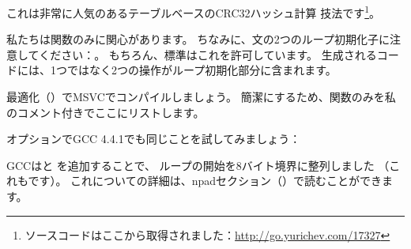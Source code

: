 \label{sec:CRC32}

\newcommand{\URLCRCSRC}{\url{http://go.yurichev.com/17327}}

これは非常に人気のあるテーブルベースのCRC32ハッシュ計算
技法です\footnote{ソースコードはここから取得されました：\URLCRCSRC}。




私たちは関数のみに関心があります。
ちなみに、文の2つのループ初期化子に注意してください：。
もちろん、\CCpp 標準はこれを許可しています。
生成されるコードには、1つではなく2つの操作がループ初期化部分に含まれます。

最適化（\Ox）でMSVCでコンパイルしましょう。
簡潔にするため、関数のみを私のコメント付きでここにリストします。



\Othree オプションでGCC 4.4.1でも同じことを試してみましょう：




GCCは\NOP と を追加することで、
ループの開始を8バイト境界に整列しました
（これもです）。
これについての詳細は、npadセクション（）で読むことができます。